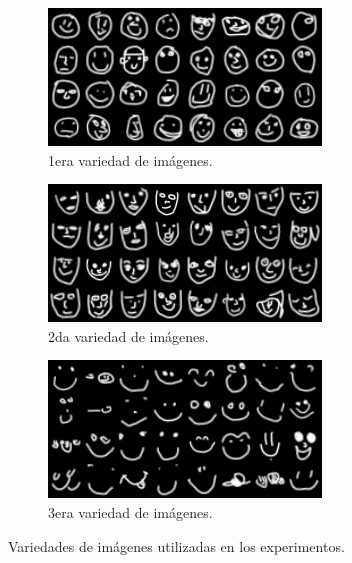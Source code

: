 \begin{figure}[H]
    \begin{subfigure}[b]{0.32\textwidth}
        \centering
        \includegraphics[width=\textwidth]{img/cluster/label1.png}
        \caption{1era variedad de imágenes.}
        \label{fig:label1-manifold}
    \end{subfigure}
    \hfill
    \begin{subfigure}[b]{0.32\textwidth}
        \centering
        \includegraphics[width=\textwidth]{img/cluster/label2.png}
        \caption{2da variedad de imágenes.}
        \label{fig:label2-manifold}
    \end{subfigure}
    \hfill
    \begin{subfigure}[b]{0.32\textwidth}
        \centering
        \includegraphics[width=\textwidth]{img/cluster/label3.png}
        \caption{3era variedad de imágenes.}
        \label{fig:label3-manifold}
    \end{subfigure}
    \caption{Variedades de imágenes utilizadas en los experimentos.}
    \label{fig:variedades-imagenes}
\end{figure}

